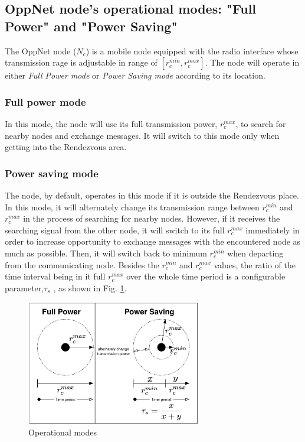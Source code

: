 \documentclass[conference]{IEEEtran}
\begin{document}
\subsection{OppNet node's operational modes: "Full Power" and "Power Saving"}
The OppNet node ($N_{c}$) is a mobile node equipped with the radio interface whose transmission rage is adjustable in range of $[{ r }_{ c }^{ min },{ r }_{ c }^{ max }]$.
The node will operate in either \emph{Full Power mode} or \emph{Power Saving mode} according to its location.
\subsubsection{Full power mode}
In this mode, the node will use its full transmission power, ${ r }_{ c }^{ max }$, to search for nearby nodes and exchange messages.
It will switch to this mode only when getting into the Rendezvous area.

\subsubsection{Power saving mode}
The node, by default, operates in this mode if it is outside the Rendezvous place.
In this mode, it will alternately change its transmission range between ${ r }_{ c }^{ min }$ and ${ r }_{ c }^{ max }$ in the process of searching for nearby nodes.
However, if it receives the searching signal from the other node, it will switch to its full ${ r }_{ c }^{ max }$ immediately in order to increase opportunity to exchange messages with the encountered node as much as possible.
Then, it will switch back to minimum ${ r }_{ c }^{ min }$ when departing from the communicating node.
Besides the ${ r }_{ c }^{ min }$ and ${ r }_{ c }^{ max }$ values, the ratio of the time interval being in it full ${ r }_{ c }^{ max }$ over the whole time period is a configurable parameter,$\tau_{s}$ , as shown in Fig. \ref{Operational modes}.

\begin{figure}[!t]
	\centering
	\includegraphics[width=3in]{Figures/OperationalMode.pdf}
	\caption{Operational modes}
	\label{Operational modes}
\end{figure}
\end{document}
